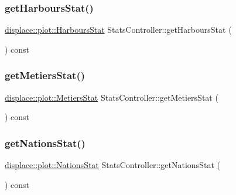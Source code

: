 \mbox{\label{class_stats_controller_a557b15092f574f5793d723ff20f65052}} 
\subsubsection{\texorpdfstring{getHarboursStat()}{getHarboursStat()}}
{\footnotesize\ttfamily \mbox{\hyperlink{namespacedisplace_1_1plot_a006fcde9bb7e602d977226ff75cb67aa}{displace\+::plot\+::\+Harbours\+Stat}} Stats\+Controller\+::get\+Harbours\+Stat (\begin{DoxyParamCaption}{ }\end{DoxyParamCaption}) const\hspace{0.3cm}{\ttfamily [inline]}}

\mbox{\label{class_stats_controller_a024d7d5105fd24b93f3922b1dc51b931}} 
\subsubsection{\texorpdfstring{getMetiersStat()}{getMetiersStat()}}
{\footnotesize\ttfamily \mbox{\hyperlink{namespacedisplace_1_1plot_a673bbc813b7f03be3dc76ae7fd087516}{displace\+::plot\+::\+Metiers\+Stat}} Stats\+Controller\+::get\+Metiers\+Stat (\begin{DoxyParamCaption}{ }\end{DoxyParamCaption}) const\hspace{0.3cm}{\ttfamily [inline]}}

\mbox{\label{class_stats_controller_a8db26fa9aa997bd73f35d1afcdce184a}} 
\subsubsection{\texorpdfstring{getNationsStat()}{getNationsStat()}}
{\footnotesize\ttfamily \mbox{\hyperlink{namespacedisplace_1_1plot_ab7b96ae3ae291a71823f371d77f27d98}{displace\+::plot\+::\+Nations\+Stat}} Stats\+Controller\+::get\+Nations\+Stat (\begin{DoxyParamCaption}{ }\end{DoxyParamCaption}) const\hspace{0.3cm}{\ttfamily [inline]}}

